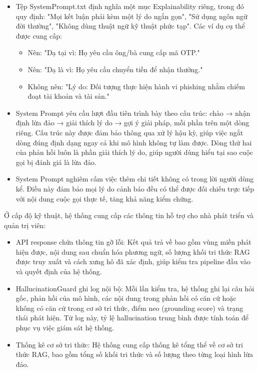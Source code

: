 \begin{itemize}
    \item Tệp SystemPrompt.txt định nghĩa một mục Explainability riêng, trong đó quy định: "Mọi kết luận phải kèm một lý do ngắn gọn", "Sử dụng ngôn ngữ đời thường", "Không dùng thuật ngữ kỹ thuật phức tạp". Các ví dụ cụ thể được cung cấp:
    \begin{itemize}
        \item Nên: "Dạ tại vì: Họ yêu cầu ông/bà cung cấp mã OTP."
        \item Nên: "Dạ là vì: Họ yêu cầu chuyển tiền để nhận thưởng."
        \item Không nên: "Lý do: Đối tượng thực hiện hành vi phishing nhằm chiếm đoạt tài khoản và tài sản."
    \end{itemize}
    \item System Prompt yêu cầu lượt đầu tiên trình bày theo cấu trúc: chào → nhận định lừa đảo → giải thích lý do → gợi ý giải pháp, mỗi phần trên một dòng riêng. Cấu trúc này được đảm bảo thông qua xử lý hậu kỳ, giúp việc ngắt dòng đúng định dạng ngay cả khi mô hình không tự làm được. Dòng thứ hai của phản hồi luôn là phần giải thích lý do, giúp người dùng hiểu tại sao cuộc gọi bị đánh giá là lừa đảo.
    \item System Prompt nghiêm cấm việc thêm chi tiết không có trong lời người dùng kể. Điều này đảm bảo mọi lý do cảnh báo đều có thể được đối chiếu trực tiếp với nội dung cuộc gọi thực tế, tăng khả năng kiểm chứng.
\end{itemize}

Ở cấp độ kỹ thuật, hệ thống cung cấp các thông tin hỗ trợ cho nhà phát triển và quản trị viên:

\begin{itemize}
    \item API response chứa thông tin gỡ lỗi: Kết quả trả về bao gồm vùng miền phát hiện được, nội dung sau chuẩn hóa phương ngữ, số lượng khối tri thức RAG được truy xuất và cách xưng hô đã xác định, giúp kiểm tra pipeline đầu vào và quyết định của hệ thống.
    \item HallucinationGuard ghi log nội bộ: Mỗi lần kiểm tra, hệ thống ghi lại câu hỏi gốc, phản hồi của mô hình, các nội dung trong phản hồi có căn cứ hoặc không có căn cứ trong cơ sở tri thức, điểm neo (grounding score) và trạng thái phát hiện. Từ log này, tỷ lệ hallucination trung bình được tính toán để phục vụ việc giám sát hệ thống.
    \item Thống kê cơ sở tri thức: Hệ thống cung cấp thống kê tổng thể về cơ sở tri thức RAG, bao gồm tổng số khối tri thức và số lượng theo từng loại hình lừa đảo.
\end{itemize}

